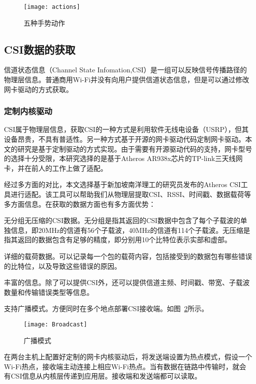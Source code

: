 \begin{figure}[htbp] %
  \centering
  \texttt{[image: actions]}
  \caption{五种手势动作}
  \label{fig:actions}
\end{figure}

 \subsection{CSI数据的获取}
信道状态信息（Channel State Infomation,CSI）是一组可以反映信号传播路径的物理层信息。普通商用Wi-Fi并没有向用户提供信道状态信息，但是可以通过修改网卡驱动的方式获取。

 \subsubsection{定制内核驱动}
CSI属于物理层信息，获取CSI的一种方式是利用软件无线电设备（USRP），但其设备昂贵，不具有普适性。另一种方式基于开源的网卡驱动代码定制网卡驱动。本文的研究是基于定制驱动的方式实现。由于需要有开源驱动代码的支持，网卡型号的选择十分受限，本研究选择的是基于Atheros AR938x芯片的TP-link三天线网卡，并在前人的工作上做了适配。

经过多方面的对比，本文选择基于新加坡南洋理工的研究员发布的Atheros CSI工具进行适配。该工具可以帮助我们从物理层提取CSI、RSSI、时间戳、数据载荷等多方面信息。在获取的数据方面也有多方面优势：

\begin{compactenum}
\item 无分组无压缩的CSI数据。无分组是指其返回的CSI数据中包含了每个子载波的单独信息，即20MHz的信道有56个子载波，40MHz的信道有114个子载波。无压缩是指其返回的数据包含有足够的精度，即分别用10个比特位表示实部和虚部。
\item 详细的载荷数据。可以记录每一个包的载荷内容，包括接受到的数据包有哪些错误的比特位，以及导致这些错误的原因。
\item 丰富的信息。除了可以提供CSI外，还可以提供信道主频、时间戳、带宽、子载波数量和传输错误类型等信息。
\item 支持广播模式。方便同时在多个地点部署CSI接收端。如图~\ref{fig:Broadcast}所示。
\begin{figure}[htbp] %
  \centering
  \texttt{[image: Broadcast]}
  \caption{广播模式}
  \label{fig:Broadcast}
\end{figure}
\end{compactenum}

在两台主机上配置好定制的网卡内核驱动后，将发送端设置为热点模式，假设一个Wi-Fi热点，接收端主动连接上相应Wi-Fi热点。当有数据在链路中传输时，就会有CSI信息从内核层传递到应用层。接收端和发送端都可以读取。

